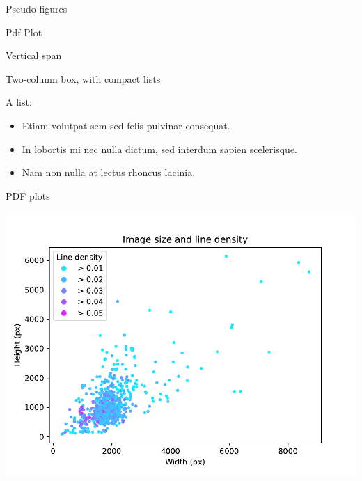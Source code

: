 \documentclass[a0paper,portrait]{baposter}
\newcommand{\compresslist}{
	\setlength{\itemsep}{0pt}%
	\setlength{\parskip}{1pt}%
	\setlength{\parsep}{0pt}%
}
\begin{document}
\begin{poster}
\begin{posterbox}[name=pseudo-figure,column=0,below=introduction,span=1]{Pseudo-figures}
        \lipsum*[2][1-5]
\end{posterbox}

\begin{posterbox}[name=pdf-plot,column=1,below=introduction,span=1]{Pdf Plot}
	\lipsum*[5]

	\lipsum*[7][5-8]
\end{posterbox}

\begin{posterbox}[name=vertical-box,column=2,below=introduction]{Vertical span}
\lipsum[10-12]

\lipsum*[1][9-11]
\end{posterbox}



\begin{posterbox}[name=segmentation,column=0,span=2,below=pseudo-figure]{Two-column box, with compact lists}

\begin{multicols}{2}
	A list:
	\begin{itemize}
        \compresslist
		\item Etiam volutpat sem sed felis pulvinar consequat.
		\item In lobortis mi nec nulla dictum, sed interdum sapien scelerisque.
		\item Nam non nulla at lectus rhoncus lacinia.
	\end{itemize}
    \lipsum[1-2]
\end{multicols}

\end{posterbox}

\begin{posterbox}[name=htr,column=0,below=segmentation,span=2,above=bottom]{PDF plots}
	\begin{minipage}{.48\linewidth}
		\lipsum[5]
	\end{minipage}\hfill
	\begin{minipage}{.48\linewidth}
	\includegraphics[width=\textwidth]{img_size_scatter_plot.pdf}
	\end{minipage}%
\end{posterbox}




\end{poster}
\end{document}
